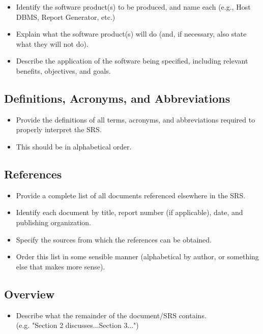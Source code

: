 \documentclass[]{article}
\begin{document}
\begin{itemize}
	\item Identify the software product(s) to be produced, and name each (e.g., Host DBMS, Report Generator, etc.)
	\newline
	\item Explain what the software product(s) will do (and, if necessary, also state what they will not do).
	\item Describe the application of the software being specified, including relevant benefits, objectives, and goals.
\end{itemize}

\subsection{Definitions, Acronyms, and Abbreviations}
\label{sub:definitions_acronyms_and_abbreviations}
\begin{itemize}
	\item Provide the definitions of all terms, acronyms, and abbreviations required to properly interpret the SRS.
	\item This should be in alphabetical order.
\end{itemize}

\subsection{References}
\label{sub:references}
\begin{itemize}
	\item Provide a complete list of all documents referenced elsewhere in the SRS.
	\item Identify each document by title, report number (if applicable), date, and publishing organization.
	\item Specify the sources from which the references can be obtained.
	\item Order this list in some sensible manner (alphabetical by author, or something else that makes more sense).
\end{itemize}

\subsection{Overview}
\label{sub:overview}
\begin{itemize}
	\item Describe what the remainder of the document/SRS contains.\\
	(e.g. "Section 2 discusses...Section 3...")
\end{itemize}
\end{document}

